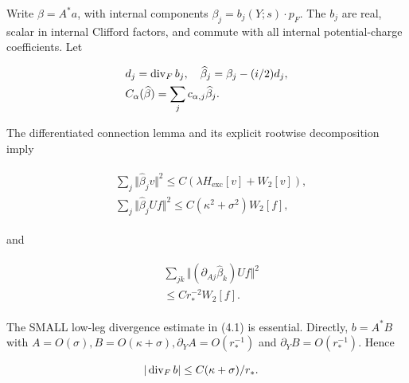 Write \(\beta =A^{*}a\), with internal components
\(\beta _{j}=b_{j}(Y;s) \cdot  p_{F}\). The \(b_{j}\) are real, scalar
in internal Clifford factors, and commute with all internal
potential-charge coefficients. Let

\begin{gather*}
\begin{aligned}
& d_{j}=\operatorname{div} _{F} b_{j}, \quad  \widehat{\beta}_{j}=\beta _{j}-(i/2)d_{j}, \\
& C_{\alpha}(\widehat{\beta})=\sum _{j} c_{\alpha ,j} \widehat{\beta}_{j}.
\end{aligned}\notag
\end{gather*}

The differentiated connection lemma and its explicit rootwise
decomposition imply

\begin{gather*}
\begin{aligned}
& \sum _{j} \Vert \widehat{\beta}_{j} v\Vert ^{2} \le  C(\lambda  H_{\mathrm{exc}}[v]+W_{2}[v]), \\
& \sum _{j} \Vert \widehat{\beta}_{j} U f\Vert ^{2} \le  C(\kappa ^{2}+\sigma ^{2})W_{2}[f],
\end{aligned}\tag{4.1}
\end{gather*}

and

\begin{gather*}
\begin{aligned}
& \sum _{jk} \Vert (\partial _{Aj} \widehat{\beta}_{k})U f\Vert ^{2} \\
& \le  C r_{*}^{-2}W_{2}[f].
\end{aligned}\tag{4.2}
\end{gather*}

The SMALL low-leg divergence estimate in (4.1) is essential. Directly,
\(b=A^{*}B\) with
\(A=O(\sigma ), B=O(\kappa +\sigma ), \partial _{Y} A=O(r_{*}^{-1})\)
and \(\partial _{Y} B=O(r_{*}^{-1})\). Hence

\begin{gather*}
\begin{aligned}
& \vert \operatorname{div} _{F} b\vert \le C(\kappa +\sigma )/r_{*}.
\end{aligned}\notag
\end{gather*}

